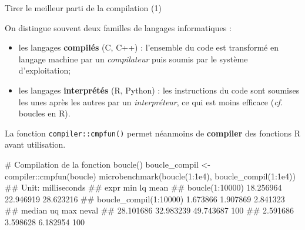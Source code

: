 \documentclass[12pt,handout,ignorenonframetext,]{beamer}
\newenvironment{Shaded}{}{}
\newcommand{\KeywordTok}[1]{\textcolor[rgb]{0.00,0.00,1.00}{#1}}
\newcommand{\DecValTok}[1]{#1}
\newcommand{\FloatTok}[1]{#1}
\newcommand{\StringTok}[1]{\textcolor[rgb]{0.00,0.50,0.50}{#1}}
\newcommand{\CommentTok}[1]{\textcolor[rgb]{0.00,0.50,0.00}{#1}}
\newcommand{\OperatorTok}[1]{#1}
\newcommand{\NormalTok}[1]{#1}
\providecommand{\tightlist}{%
  \setlength{\itemsep}{0pt}\setlength{\parskip}{0pt}}
\renewenvironment{Shaded}{\begin{snugshade}}{\end{snugshade}}
\begin{document}
\begin{frame}[fragile]{Tirer le meilleur parti de la compilation (1)}

On distingue souvent deux familles de langages informatiques :

\begin{itemize}
\tightlist
\item
  \pause \vspace{-0.2cm} les langages \textbf{compilés} (C, C++) :
  l'ensemble du code est transformé en langage machine par un
  \emph{compilateur} puis soumis par le système d'exploitation;
\item
  \pause les langages \textbf{interprétés} (R, Python) : les
  instructions du code sont soumises les unes après les autres par un
  \emph{interpréteur}, ce qui est moins efficace (\emph{cf.} boucles en
  R).
\end{itemize}

\vspace{0.1cm} \pause La fonction \texttt{compiler::cmpfun()} permet
néanmoins de \textbf{compiler} des fonctions R avant utilisation.

\pause \footnotesize \vspace{-0.2cm}

\begin{Shaded}
\begin{Highlighting}[]
\CommentTok{# Compilation de la fonction boucle()}
\NormalTok{boucle_compil <-}\StringTok{ }\NormalTok{compiler}\OperatorTok{::}\KeywordTok{cmpfun}\NormalTok{(boucle)}
\KeywordTok{microbenchmark}\NormalTok{(}\KeywordTok{boucle}\NormalTok{(}\DecValTok{1}\OperatorTok{:}\FloatTok{1e4}\NormalTok{), }\KeywordTok{boucle_compil}\NormalTok{(}\DecValTok{1}\OperatorTok{:}\FloatTok{1e4}\NormalTok{))}
\NormalTok{  ## Unit: milliseconds}
\NormalTok{  ##                    expr       min        lq      mean}
\NormalTok{  ##         boucle(1:10000) 18.256964 22.946919 28.623216}
\NormalTok{  ##  boucle_compil(1:10000)  1.673866  1.907869  2.841323}
\NormalTok{  ##     median        uq       max neval}
\NormalTok{  ##  28.101686 32.983239 49.743687   100}
\NormalTok{  ##   2.591686  3.598628  6.182954   100}
\end{Highlighting}
\end{Shaded}

\end{frame}
\end{document}
